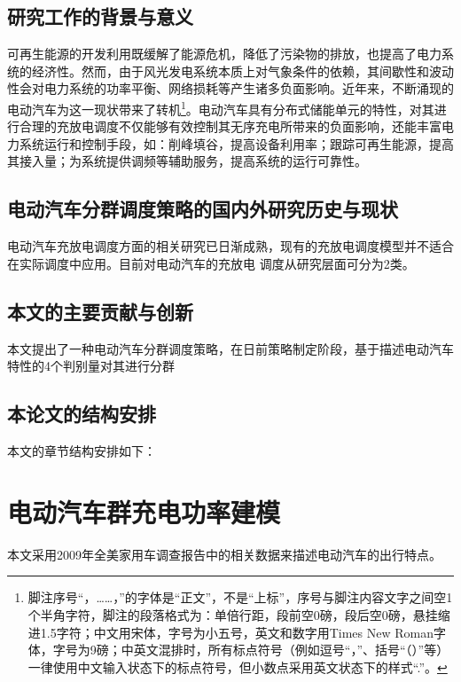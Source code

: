 \documentclass[bachelor]{NCEPU-thesis}
\begin{document}
\section{研究工作的背景与意义}


可再生能源的开发利用既缓解了能源危机，降低了污染物的排放，也提高了电力系统的经济性。然而，由于风光发电系统本质上对气象条件的依赖，其间歇性和波动性会对电力系统的功率平衡、网络损耗等产生诸多负面影响。近年来，不断涌现的电动汽车为这一现状带来了转机\footnote{脚注序号“，……，”的字体是“正文”，不是“上标”，序号与脚注内容文字之间空1个半角字符，脚注的段落格式为：单倍行距，段前空0磅，段后空0磅，悬挂缩进1.5字符；中文用宋体，字号为小五号，英文和数字用Times New Roman字体，字号为9磅；中英文混排时，所有标点符号（例如逗号“，”、括号“（）”等）一律使用中文输入状态下的标点符号，但小数点采用英文状态下的样式“.”。}。电动汽车具有分布式储能单元的特性，对其进行合理的充放电调度不仅能够有效控制其无序充电所带来的负面影响，还能丰富电力系统运行和控制手段，如：削峰填谷，提高设备利用率；跟踪可再生能源，提高其接入量；为系统提供调频等辅助服务，提高系统的运行可靠性。

\section{电动汽车分群调度策略的国内外研究历史与现状}
电动汽车充放电调度方面的相关研究已日渐成熟，现有的充放电调度模型并不适合在实际调度中应用。目前对电动汽车的充放电
调度从研究层面可分为2类。

\section{本文的主要贡献与创新}
本文提出了一种电动汽车分群调度策略，在日前策略制定阶段，基于描述电动汽车特性的4个判别量对其进行分群

\section{本论文的结构安排}
本文的章节结构安排如下：
\chapter{电动汽车群充电功率建模}
本文采用2009年全美家用车调查报告中的相关数据来描述电动汽车的出行特点。
\end{document}
